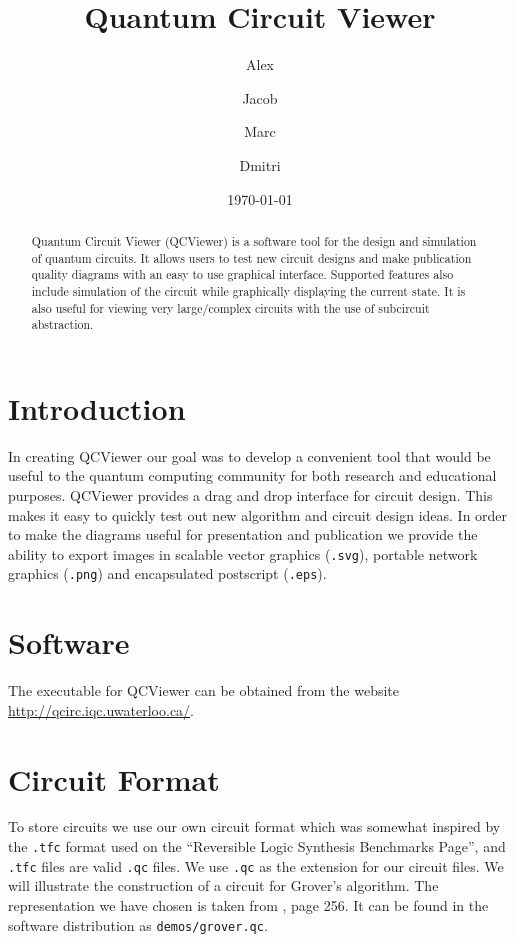 \documentclass[aps,prl,reprint,floatfix,superscriptaddress]{revtex4-1} %
\begin{document}

\title{Quantum Circuit Viewer}
\date{\today}
\author{Alex }
\author{Jacob }
\author{Marc }
\author{Dmitri }
\begin{abstract}
Quantum Circuit Viewer (QCViewer) is a software tool for the design and simulation of quantum circuits.  
It allows users to test new circuit designs and make publication quality diagrams with an easy to use graphical interface.  
Supported features also include simulation of the circuit while graphically displaying the current state.
It is also useful for viewing very large/complex circuits with the use of subcircuit abstraction.
\end{abstract}
\maketitle

\section{Introduction}
In creating QCViewer our goal was to develop a convenient tool that would be useful to the quantum computing community for both research and educational purposes. 
QCViewer provides a drag and drop interface for circuit design.  
This makes it easy to quickly test out new algorithm and circuit design ideas.
In order to make the diagrams useful for presentation and publication we provide the ability to export images in scalable vector graphics (\verb+.svg+), portable network graphics (\verb+.png+) and encapsulated postscript (\verb+.eps+).

\section{Software}
The executable for QCViewer can be obtained from the website \url{http://qcirc.iqc.uwaterloo.ca/}.

\section{Circuit Format}
To store circuits we use our own circuit format which was somewhat inspired by the \verb+.tfc+ format used on the ``Reversible Logic Synthesis Benchmarks Page''\cite{maslovBench}, and \verb+.tfc+ files are valid \verb+.qc+ files.
We use \verb+.qc+ as the extension for our circuit files.
We will illustrate the construction of a circuit for Grover's algorithm.  
The representation we have chosen is taken from \cite{nielsen2000quantum}, page 256.
It can be found in the software distribution as \verb+demos/grover.qc+.
\end{document}
